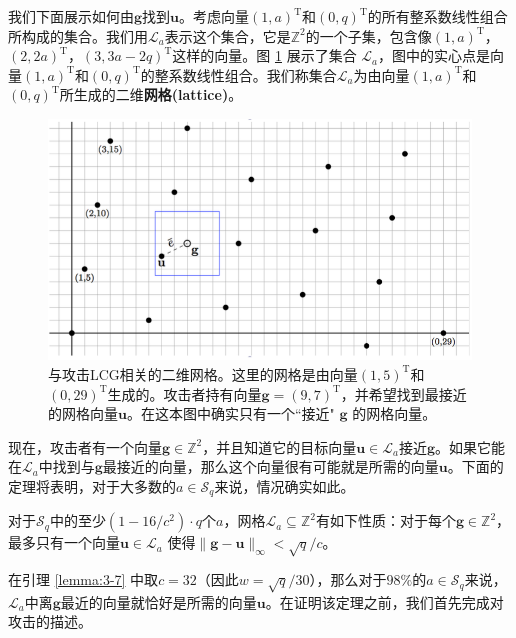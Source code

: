 \begin{snote}[密码分析。]
我们下面展示如何由$\boldsymbol{g}$找到$\boldsymbol{u}$。考虑向量$(1,a)^\mathrm{T}$和$(0,q)^\mathrm{T}$的所有整系数线性组合所构成的集合。我们用$\mathcal{L}_a$表示这个集合，它是$\mathbb{Z}^2$的一个子集，包含像$(1,a)^\mathrm{T}$，$(2,2a)^\mathrm{T}$，$(3,3a-2q)^\mathrm{T}$这样的向量。图 \ref{fig:3-9} 展示了集合 $\mathcal{L}_a$，图中的实心点是向量$(1,a)^\mathrm{T}$和$(0,q)^\mathrm{T}$的整系数线性组合。我们称集合$\mathcal{L}_a$为由向量$(1,a)^\mathrm{T}$和$(0,q)^\mathrm{T}$所生成的二维\textbf{网格(lattice)}。

\begin{figure}
  \centering
  \includegraphics[width=0.6\linewidth]{figures/chapter3/fig9.png}
  \caption{与攻击LCG相关的二维网格。这里的网格是由向量$(1,5)^\mathrm{T}$和$(0,29)^\mathrm{T}$生成的。攻击者持有向量$\boldsymbol{g}=(9,7)^\mathrm{T}$，并希望找到最接近的网格向量$\boldsymbol{u}$。在这本图中确实只有一个``接近" $\boldsymbol{g}$ 的网格向量。}
  \label{fig:3-9}
\end{figure}

现在，攻击者有一个向量$\boldsymbol{g}\in\mathbb{Z}^2$，并且知道它的目标向量$\boldsymbol{u}\in\mathcal{L}_a$接近$\boldsymbol{g}$。如果它能在$\mathcal{L}_a$中找到与$\boldsymbol{g}$最接近的向量，那么这个向量很有可能就是所需的向量$\boldsymbol{u}$。下面的定理将表明，对于大多数的$a\in\mathcal{S}_q$来说，情况确实如此。
\end{snote}

\begin{lemma}\label{lemma:3-7}
对于$\mathcal{S}_q$中的至少$(1-16/c^2)\cdot q$个$a$，网格$\mathcal{L}_a\subseteq\mathbb{Z}^2$有如下性质：对于每个$\boldsymbol{g}\in\mathbb{Z}^2$，最多只有一个向量$\boldsymbol{u}\in\mathcal{L}_a$ 使得$\lVert\boldsymbol{g}-\boldsymbol{u}\rVert_\infty < \sqrt{q}/c$。
\end{lemma}

在引理 \ref{lemma:3-7} 中取$c=32$（因此$w=\sqrt{q}/30$），那么对于$98\%$的$a\in\mathcal{S}_q$来说，$\mathcal{L}_a$中离$\boldsymbol{g}$最近的向量就恰好是所需的向量$\boldsymbol{u}$。在证明该定理之前，我们首先完成对攻击的描述。

